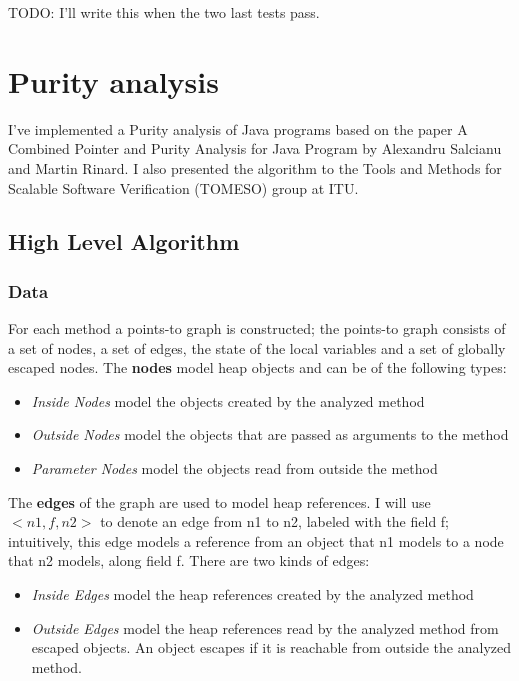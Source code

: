 \documentclass[11pt]{exam}
\begin{document}
TODO: I'll write this when the two last tests pass.

\newpage

\section{Purity analysis}

I've implemented a Purity analysis of Java programs based on the paper
A Combined Pointer and Purity Analysis for Java Program by Alexandru
Salcianu and Martin Rinard. I also presented the algorithm to the
Tools and Methods for Scalable Software Verification (TOMESO) group at
ITU.

\subsection{High Level Algorithm}

\subsubsection*{Data}

For each method a points-to graph is constructed; the points-to graph
consists of a set of nodes, a set of edges, the state of the local
variables and a set of globally escaped nodes. The \textbf{nodes}
model heap objects and can be of the following types:

\begin{itemize}
  \setlength{\itemsep}{1pt}
  \setlength{\parskip}{0pt}
  \item \emph{Inside Nodes} model the objects created by the analyzed method
  \item \emph{Outside Nodes} model the objects that are passed as arguments 
        to the method
  \item \emph{Parameter Nodes} model the objects read from outside the method
\end{itemize}

The \textbf{edges} of the graph are used to model heap references. I will use
$<n1,f,n2>$ to denote an edge from n1 to n2, labeled with the field f;
intuitively, this edge models a reference from an object that n1
models to a node that n2 models, along field f. There are two kinds of
edges:

\begin{itemize}
  \setlength{\itemsep}{1pt}
  \setlength{\parskip}{0pt}
  \item \emph{Inside Edges} model the heap references created by the analyzed 
        method
  \item \emph{Outside Edges} model the heap references read by the analyzed 
        method from escaped objects. An object escapes if it is reachable 
        from outside the analyzed method.
\end{itemize}
\end{document}
